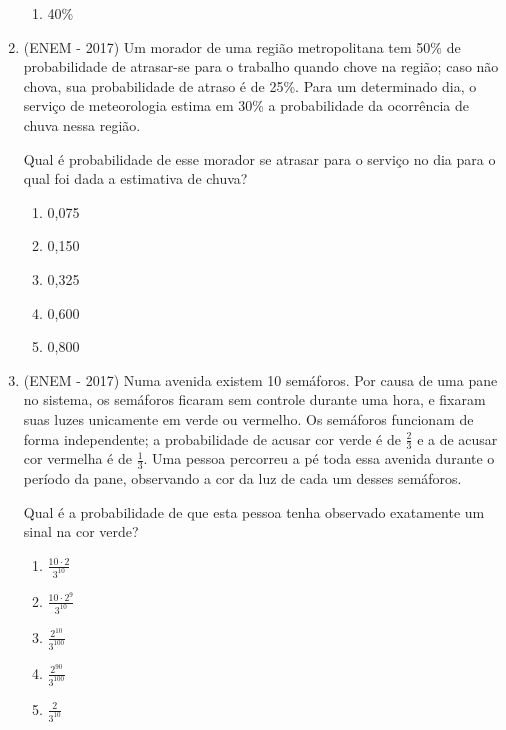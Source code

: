 \begin{enumerate}
\begin{enumerate}
\item {} 
40\%

\end{enumerate}

\item (ENEM - 2017) Um morador de uma região metropolitana tem 50\% de probabilidade de atrasar-se para o trabalho quando chove na região; caso não chova, sua probabilidade de atraso é de 25\%. Para um determinado dia, o serviço de meteorologia estima em 30\% a probabilidade da ocorrência de chuva nessa região.

Qual é probabilidade de esse morador se atrasar para o serviço no dia para o qual foi dada a estimativa de chuva?
\begin{enumerate}
\item {} 
0,075

\item {} 
0,150

\item {} 
0,325

\item {} 
0,600

\item {} 
0,800

\end{enumerate}

\item (ENEM - 2017) Numa avenida existem 10 semáforos. Por causa de uma pane no sistema, os semáforos ficaram sem controle durante uma hora, e fixaram suas luzes unicamente em verde ou vermelho. Os semáforos funcionam de forma independente; a probabilidade de acusar cor verde é de \(\frac{2}{3}\) e a de acusar cor vermelha é de \(\frac{1}{3}\). Uma pessoa percorreu a pé toda essa avenida durante o período da pane, observando a cor da luz de cada um desses semáforos.

Qual é a probabilidade de que esta pessoa tenha observado exatamente um sinal na cor verde?
\begin{enumerate}
\item {} 
\(\displaystyle\frac{10\cdot 2}{3^{10}}\)

\item {} 
\(\displaystyle \frac{10\cdot 2^9}{3^{10}}\)

\item {} 
\(\displaystyle\frac{2^{10}}{3^{100}}\)

\item {} 
\(\displaystyle\frac{2^{90}}{3^{100}}\)

\item {} 
\(\displaystyle\frac{2}{3^{10}}\)


\end{enumerate}
\end{enumerate}
